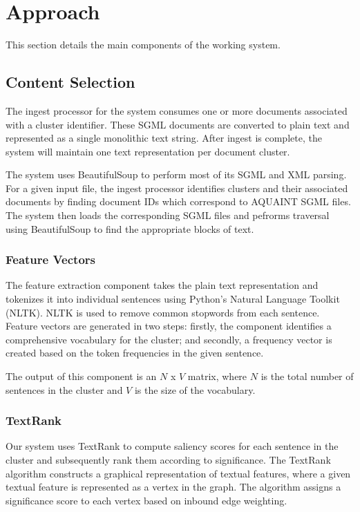 \documentclass[11pt]{article}
\begin{document}
\section{Approach}

This section details the main components of the working system.

\subsection{Content Selection}
The ingest processor for the system consumes one or more documents associated with a cluster identifier. These SGML documents are converted to plain text and represented as a single monolithic text string. After ingest is complete, the system will maintain one text representation per document cluster.

The system uses BeautifulSoup to perform most of its SGML and XML parsing. For a given input file, the ingest processor identifies clusters and their associated documents by finding document IDs which correspond to AQUAINT SGML files. The system then loads the corresponding SGML files and pefrorms traversal using BeautifulSoup to find the appropriate blocks of text.
\subsubsection{Feature Vectors}
The feature extraction component takes the plain text representation and tokenizes it into individual sentences using Python's Natural Language Toolkit (NLTK). NLTK is used to remove common stopwords from each sentence. Feature vectors are generated in two steps: firstly, the component identifies a comprehensive vocabulary for the cluster; and secondly, a frequency vector is created based on the token frequencies in the given sentence. 

The output of this component is an $N$ x $V$ matrix, where $N$ is the total number of sentences in the cluster and $V$ is the size of the vocabulary. 
\subsubsection{TextRank}
Our system uses TextRank to compute saliency scores for each sentence in the cluster and subsequently rank them according to significance. The TextRank algorithm constructs a graphical representation of textual features, where a given textual feature is represented as a vertex in the graph. The algorithm assigns a significance score to each vertex based on inbound edge weighting.
\end{document}
